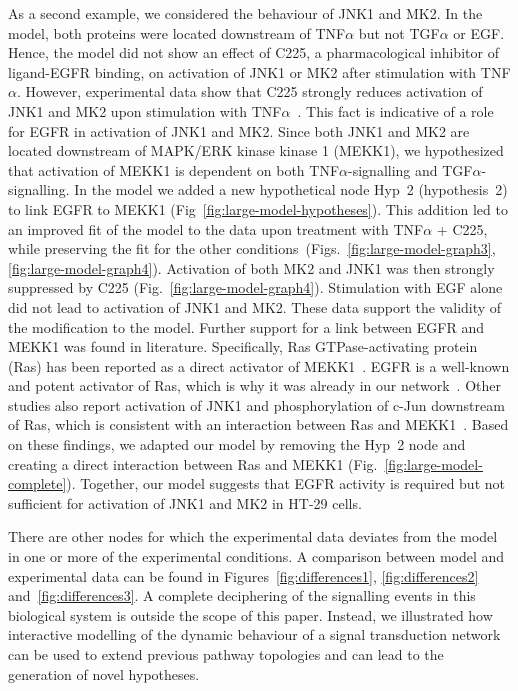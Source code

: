As a second example, we considered the behaviour of JNK1 and MK2. In the model, both
proteins were located downstream of TNF$\alpha$ but not TGF$\alpha$ or EGF. Hence, the
model did not show an effect of C225, a pharmacological inhibitor of ligand-EGFR
binding, on activation of JNK1 or MK2 after stimulation with TNF$\alpha$. However, experimental
data show that C225 strongly reduces activation of JNK1 and MK2 upon stimulation with 
TNF$\alpha$~\citep{pathway-autocrine}.
This fact is indicative of a role for EGFR in activation of JNK1 and MK2. Since both JNK1 and MK2
are located downstream of MAPK/ERK kinase kinase 1 (MEKK1), we hypothesized that activation
of MEKK1 is dependent on
both TNF$\alpha$-signalling and TGF$\alpha$-signalling. In the model we added a new
hypothetical node {\sf Hyp~2} (hypothesis~2) to link EGFR to MEKK1 (Fig~\ref{fig:large-model-hypotheses}).
This addition led to an improved fit of the model to the data upon treatment with TNF$\alpha$ + C225, 
while preserving the fit
for the other conditions~(Figs.~\ref{fig:large-model-graph3}, \ref{fig:large-model-graph4}). 
Activation of both MK2 and JNK1
was then strongly suppressed by C225 (Fig.~\ref{fig:large-model-graph4}).
Stimulation with EGF alone did not lead to activation of JNK1 and MK2.
These data support the validity of the modification to the model.
Further support for a link between EGFR and MEKK1 was found in literature. Specifically,
Ras GTPase-activating protein (Ras) has been reported as a direct activator of
MEKK1~\citep{ras-mekk1}. EGFR is a well-known and potent activator of Ras,
which is why it was already in our network~\citep{kegg}.
Other studies also report activation of JNK1 and phosphorylation of c-Jun downstream of Ras, which is consistent with
an interaction between Ras and MEKK1~\citep{cfos-cjun,ras-jnk1}.
Based on these findings, we adapted
our model by removing the {\sf Hyp~2} node and creating a direct interaction between Ras
and MEKK1 (Fig.~\ref{fig:large-model-complete}). Together, our model suggests that EGFR activity is required 
but not sufficient for activation of JNK1 and MK2 in HT-29 cells.


There are other nodes for which the experimental data deviates from the model in one or more of the experimental conditions.
A comparison between model and experimental data can be found in Figures~\ref{fig:differences1}, \ref{fig:differences2} and~\ref{fig:differences3}.
A complete deciphering of the signalling events
in this biological system is outside the scope of this paper. Instead, we illustrated how interactive modelling of the dynamic behaviour
of a signal transduction network can be used to extend previous pathway topologies and can lead to the generation of novel hypotheses.
